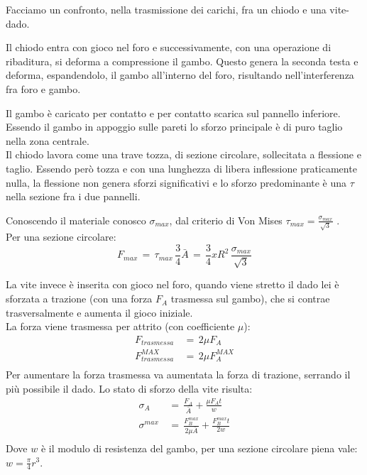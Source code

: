 \begin{esempioBox}
    Facciamo un confronto, nella trasmissione dei carichi, fra un chiodo e una vite-dado.

    Il chiodo entra con gioco nel foro e successivamente, con una operazione di ribaditura, si deforma a compressione il gambo. Questo genera la seconda testa e deforma, espandendolo, il gambo all'interno del foro, risultando nell'interferenza fra foro e gambo.

    Il gambo è caricato per contatto e per contatto scarica sul pannello inferiore. Essendo il gambo in appoggio sulle pareti lo sforzo principale è di puro taglio nella zona centrale. \\
    Il chiodo lavora come una trave tozza, di sezione circolare, sollecitata a flessione e taglio. Essendo però tozza e con una lunghezza di libera inflessione praticamente nulla, la flessione non genera sforzi significativi e lo sforzo predominante  è una $\tau$ nella sezione fra i due pannelli.

    Conoscendo il materiale conosco $\sigma_{max}$, dal criterio di Von Mises $\tau_{max}= \frac{\sigma_{max}}{\sqrt{3}}$ .\\
    Per una sezione circolare:
    \begin{equation*}
        F_{max} \,=\, \tau_{max}\,  \frac{3}{4}\bar{A}\,=\,  \frac{3}{4}xR^2\,\frac{\sigma_{max}}{\sqrt{3}}
    \end{equation*}

    La vite invece è inserita con gioco nel foro, quando viene stretto il dado lei è sforzata a trazione (con una forza $F_A$ trasmessa sul gambo), che si contrae trasversalmente e aumenta il gioco iniziale. \\
    La forza viene trasmessa per attrito (con coefficiente $\mu$):
    \begin{align*}
        F_{trasmessa}\,&=\, 2\mu F_A\\
         F_{trasmessa}^{MAX}\,&=\, 2\mu F_A^{MAX}\\
    \end{align*}
    Per aumentare la forza trasmessa va aumentata la forza di trazione, serrando il più possibile il dado.
    Lo stato di sforzo della vite risulta:
    \begin{align*}
        \sigma_A\,&=\,\frac{F_A}{\bar{A}} + \frac{\mu F_A t}{w}\\
         \sigma^{max}\,&=\,\frac{F^{max}_B}{2\mu\bar{A} } + \frac{F^{max}_B t}{2w}\\
    \end{align*}
    Dove $w$ è il modulo di resistenza del gambo, per una sezione circolare piena vale: $w=\frac{\pi}{4}r^3$.



\end{esempioBox}
